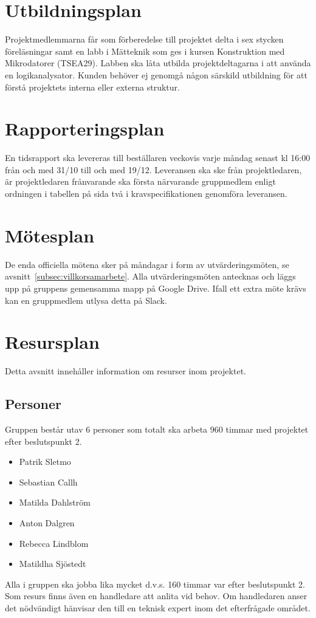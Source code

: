 \documentclass{article}
\begin{document}
\section{Utbildningsplan}
Projektmedlemmarna får som förberedelse till projektet delta i sex stycken föreläsningar samt en labb i Mätteknik som ges i kursen Konstruktion med Mikrodatorer (TSEA29). Labben ska låta utbilda projektdeltagarna i att använda en logikanalysator. Kunden behöver ej genomgå någon särskild utbildning för att förstå projektets interna eller externa struktur.

\section{Rapporteringsplan}
En tidsrapport ska levereras till beställaren veckovis varje måndag senast kl 16:00 från och med 31/10 till och med 19/12. Leveransen ska ske från projektledaren, är projektledaren frånvarande ska första närvarande gruppmedlem enligt ordningen i tabellen på sida två i kravspecifikationen genomföra leveransen.

\section{Mötesplan}
De enda officiella mötena sker på måndagar i form av utvärderingsmöten, se avsnitt~\ref{subsec:villkorsamarbete}. Alla utvärderingsmöten antecknas och läggs upp på gruppens gemensamma mapp på Google Drive. Ifall ett extra möte krävs kan en gruppmedlem utlysa detta på Slack.

\section{Resursplan}
Detta avsnitt innehåller information om resurser inom projektet.
\subsection{Personer}
Gruppen består utav 6 personer som totalt ska arbeta 960 timmar med projektet efter beslutspunkt 2.
\begin{itemize}
  \item Patrik Sletmo
  \item Sebastian Callh
  \item Matilda Dahlström
  \item Anton Dalgren
  \item Rebecca Lindblom
  \item Matildha Sjöstedt
\end{itemize}
Alla i gruppen ska jobba lika mycket d.v.s. 160 timmar var efter beslutspunkt 2.
\newline\newline
Som resurs finns även en handledare att anlita vid behov. Om handledaren anser det nödvändigt hänvisar den till en teknisk expert inom det efterfrågade området.
\end{document}
